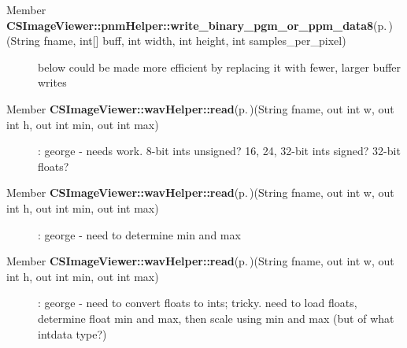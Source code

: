 \label{todo__todo000005}
 \begin{description}
\item[Member {\bf CSImage\-Viewer::pnm\-Helper::write\_\-binary\_\-pgm\_\-or\_\-ppm\_\-data8}{\rm (p.\,\pageref{class_c_s_image_viewer_1_1pnm_helper_60a4449366845ae713e39edda7adfed1})}(String fname, int\mbox{[}\mbox{]} buff, int width, int height, int samples\_\-per\_\-pixel) ]below could be made more efficient by replacing it with fewer, larger buffer writes \end{description}


\label{todo__todo000008}
 \begin{description}
\item[Member {\bf CSImage\-Viewer::wav\-Helper::read}{\rm (p.\,\pageref{class_c_s_image_viewer_1_1wav_helper_82fc29c317a64b6536d17d07faecf798})}(String fname, out int w, out int h, out int min, out int max) ]: george - needs work. 8-bit ints unsigned? 16, 24, 32-bit ints signed? 32-bit floats? \end{description}


\label{todo__todo000008}
 \begin{description}
\item[Member {\bf CSImage\-Viewer::wav\-Helper::read}{\rm (p.\,\pageref{class_c_s_image_viewer_1_1wav_helper_82fc29c317a64b6536d17d07faecf798})}(String fname, out int w, out int h, out int min, out int max) ]: george - need to determine min and max \end{description}


\label{todo__todo000008}
 \begin{description}
\item[Member {\bf CSImage\-Viewer::wav\-Helper::read}{\rm (p.\,\pageref{class_c_s_image_viewer_1_1wav_helper_82fc29c317a64b6536d17d07faecf798})}(String fname, out int w, out int h, out int min, out int max) ]: george - need to convert floats to ints; tricky. need to load floats, determine float min and max, then scale using min and max (but of what intdata type?) \end{description}
